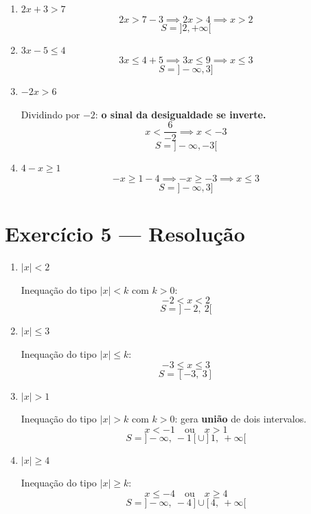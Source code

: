\documentclass[12pt, a4paper]{article}
\begin{document}
\begin{enumerate}[label=(\alph*)]

    \item $2x + 3 > 7$
    \[
        2x > 7 - 3 \implies 2x > 4 \implies x > 2
    \]
    \[
        \boxed{S = ]2, +\infty[}
    \]

    \item $3x - 5 \leq 4$
    \[
        3x \leq 4 + 5 \implies 3x \leq 9 \implies x \leq 3
    \]
    \[
        \boxed{S = ]-\infty, 3]}
    \]

    \item $-2x > 6$

    Dividindo por $-2$: \textbf{o sinal da desigualdade se inverte.}
    \[
        x < \frac{6}{-2} \implies x < -3
    \]
    \[
        \boxed{S = ]-\infty, -3[}
    \]

    \item $4 - x \geq 1$
    \[
        -x \geq 1 - 4 \implies -x \geq -3 \implies x \leq 3
    \]
    \[
        \boxed{S = ]-\infty, 3]}
    \]

\end{enumerate}
\pagebreak

\section*{Exercício 5 — Resolução}

\begin{enumerate}[label=(\alph*)]

    \item $|x| < 2$

    Inequação do tipo $|x| < k$ com $k > 0$:
    \[
        -2 < x < 2
    \]
    \[
        \boxed{S = ]-2,\ 2[}
    \]

    \item $|x| \leq 3$

    Inequação do tipo $|x| \leq k$:
    \[
        -3 \leq x \leq 3
    \]
    \[
        \boxed{S = [-3,\ 3]}
    \]

    \item $|x| > 1$

    Inequação do tipo $|x| > k$ com $k > 0$: gera \textbf{união} de dois intervalos.
    \[
        x < -1 \quad \text{ou} \quad x > 1
    \]
    \[
        \boxed{S = ]-\infty,\ -1[ \cup ]1,\ +\infty[}
    \]

    \item $|x| \geq 4$

    Inequação do tipo $|x| \geq k$:
    \[
        x \leq -4 \quad \text{ou} \quad x \geq 4
    \]
    \[
        \boxed{S = ]-\infty,\ -4\,] \cup [\,4,\ +\infty[}
    \]

\end{enumerate}
\end{document}
